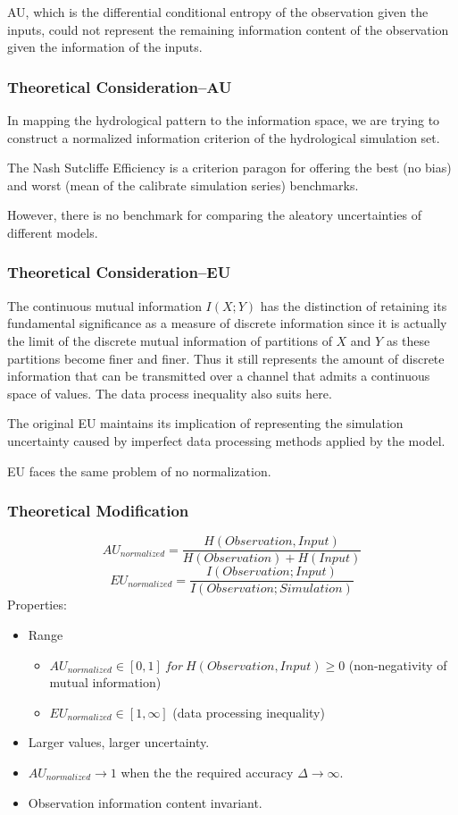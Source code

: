 \documentclass{beamer}
\begin{document}
\begin{CJK}{UTF8}{gkai}
\begin{frame}
AU, which is the differential conditional entropy of the observation given the inputs, could not represent the remaining information content of the observation given the information of the inputs.
\end{frame}

\begin{frame}
\frametitle{Theoretical Consideration--AU}
In mapping the hydrological pattern to the information space, we are trying to construct a normalized information criterion of the hydrological simulation set.

The Nash Sutcliffe Efficiency is a criterion paragon  for offering the best (no bias) and worst (mean of the calibrate simulation series) benchmarks.

However, there is no benchmark for comparing the aleatory uncertainties of different models. 
\end{frame}

\begin{frame}
\frametitle{Theoretical Consideration--EU}
The continuous mutual information $I(X;Y)$ has the distinction of retaining its fundamental significance as a measure of discrete information since it is actually the limit of the discrete mutual information of partitions of $X$ and $Y$ as these partitions become finer and finer. Thus it still represents the amount of discrete information that can be transmitted over a channel that admits a continuous space of values. The data process inequality also suits here.

The original EU maintains its implication of representing the simulation uncertainty caused by imperfect data processing methods applied by the model.

EU faces the same problem of no normalization.
\end{frame}

\begin{frame}
\frametitle{Theoretical Modification}
\begin{equation*}
AU_{normalized}= \frac{H(Observation,Input)}{H(Observation)+H(Input)}
\end{equation*}
\begin{equation*}
EU_{normalized}=\frac{I(Observation;Input)}{I(Observation;Simulation)}
\end{equation*}
Properties:
\begin{itemize}
\item Range
\begin{itemize}
\item $AU_{normalized}\in [0,1] ~for~H(Observation,Input)\geq 0$ (non-negativity of mutual information)
\item $EU_{normalized}\in [1,\infty]$ (data processing inequality)
\end{itemize}
\item Larger values, larger uncertainty.
\item $AU_{normalized} \to 1$ when the the required accuracy $\Delta \to \infty$.
\item Observation information content invariant.
\end{itemize}
\end{frame}



\end{CJK}
\end{document}
